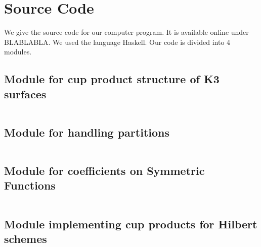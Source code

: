 \appendix
\section{Source Code}
We give the source code for our computer program. It is available online under BLABLABLA. We used the language Haskell. Our code is divided into 4 modules.
\subsection{Module for cup product structure of K3 surfaces} $\ $

\subsection{Module for handling partitions}$\ $

\subsection{Module for coefficients on Symmetric Functions}$\ $

\subsection{Module implementing cup products for Hilbert schemes}$\ $

 
